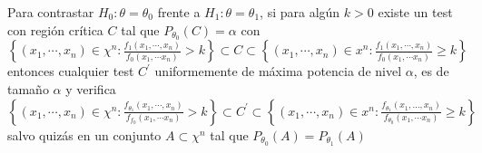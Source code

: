 \begin{teorema} 
Para contrastar $H_{0}: \theta=\theta_{0}$ frente a $H_{1}: \theta=\theta_{1}$, si para algún $k>0$ existe un test con región crítica $C$ tal que $P_{\theta_{0}}(C)=\alpha$ con $\left\{\left(x_{1}, \cdots, x_{n}\right) \in \chi^{n}: \frac{f_{1}\left(x_{1}, \cdots, x_{n}\right)}{f_{0}\left(x_{1}, \cdots x_{n}\right)}>k\right\} \subset C \subset \left\{\left(x_{1}, \cdots, x_{n}\right) \in x^{n}: \frac{f_{1}\left(x_{1}, \cdots, x_{n}\right)}{f_{0}\left(x_{1}, \cdots x_{n}\right)} \geq k\right\}$ entonces cualquier test $C^{\prime}$ uniformemente de máxima potencia de nivel $\alpha$, es de tamaño $\alpha$ y verifica\\
$\left\{\left(x_{1}, \cdots, x_{n}\right) \in \chi^{n}: \frac{f_{\theta_{1}}\left(x_{1}, \cdots, x_{n}\right)}{f_{f_{0}}\left(x_{1}, \cdots x_{n}\right)}>k\right\} \subset C^{\prime} \subset\left\{\left(x_{1}, \cdots, x_{n}\right) \in x^{n}: \frac{f_{\theta_{1}}\left(x_{1}, \ldots, x_{n}\right)}{f_{\theta_{0}}\left(x_{1}, \cdots x_{n}\right)} \geq k\right\}$ salvo quizás en un conjunto $A \subset \chi^{n}$ tal que $P_{\theta_{0}}(A)=P_{\theta_{1}}(A)$
\end{teorema}

